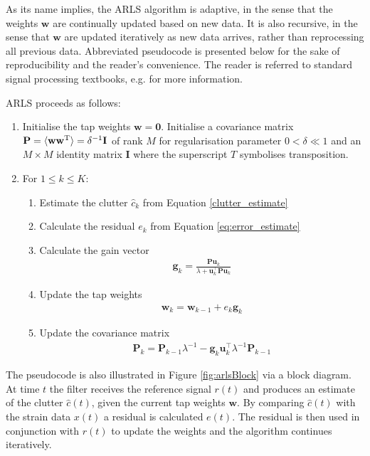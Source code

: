 \documentclass[pra,superscriptaddress,reprint,amsmath,amssymb,nofootinbib]{revtex4-2}
\begin{document}
As its name implies, the ARLS algorithm is adaptive, in the sense that the weights $\mathbf{w}$ are continually updated based on new data. It is also recursive, in the sense that $\mathbf{w}$ are updated iteratively as new data arrives, rather than reprocessing all previous data. Abbreviated pseudocode is presented below for the sake of reproducibility and the reader's convenience. The reader is referred to standard signal processing textbooks, e.g. \cite{HaykinAdaptiveFT:2002} for more information. \newline 

ARLS proceeds as follows:

\begin{enumerate}
	\item Initialise the tap weights $\mathbf{w} = \mathbf{0}$. Initialise a covariance matrix ${\bf P} = \langle {\bf w} {\bf w}^{\rm T} \rangle = \delta^{-1} {\bf I}$ of rank $M$ for regularisation parameter $0 < \delta \ll 1$  and an $M \times M$ identity matrix $\mathbf{I}$ where the superscript $T$ symbolises transposition.
	\item For $1 \leq k \leq K$:
	\begin{enumerate}
		\item Estimate the clutter $\hat{c}_k$ from Equation \eqref{clutter_estimate}
		\item Calculate the residual $e_k$ from Equation \eqref{eq:error_estimate}
		\item Calculate the gain vector
		\begin{eqnarray}
			\mathbf{g}_k = \frac{\mathbf{P} \mathbf{u}_k}{\lambda + \mathbf{u}_k^{\intercal}\mathbf{P} \mathbf{u}_k}
		\end{eqnarray}
	\item Update the tap weights
			\begin{eqnarray}
		\mathbf{w}_k = \mathbf{w}_{k-1} +  e_k \mathbf{g}_k 
	\end{eqnarray}
	\item Update the covariance matrix
\begin{eqnarray}
	\mathbf{P}_k =  \mathbf{P}_{k-1}  \lambda^{-1}  - \mathbf{g}_k \mathbf{u}_k^{\intercal}  \lambda^{-1} \mathbf{P}_{k-1} 
\end{eqnarray}

	\end{enumerate}

\end{enumerate}
The pseudocode is also illustrated in Figure \ref{fig:arlsBlock} via a block diagram. At time $t$ the filter receives the reference signal $r(t)$ and produces an estimate of the clutter $\hat{c}(t)$, given the current tap weights $\mathbf{w}$. By comparing $\hat{c}(t)$ with the strain data $x(t)$ a residual is calculated $e(t)$. The residual is then used in conjunction with $r(t)$ to update the weights and the algorithm continues iteratively. \newline 
\end{document}
